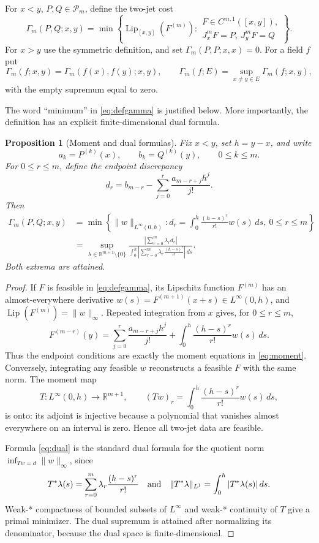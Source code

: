 \documentclass[11pt]{article}
\newtheorem{proposition}[theorem]{Proposition}
\newcommand{\R}{\mathbb R}
\newcommand{\Pm}{\mathcal P_m}
\newcommand{\Lip}{\operatorname{Lip}}
\newcommand{\J}{J}
\begin{document}
For $x<y$, $P,Q\in\Pm$, define the two-jet cost
\begin{equation}\label{eq:defgamma}
 \Gamma_m(P,Q;x,y)=
 \min\left\{\Lip_{[x,y]}(F^{(m)}):
 \begin{array}{l}
 F\in C^{m,1}([x,y]),\\[-2pt]
 \J_x^mF=P,\ \J_y^mF=Q
 \end{array}\right\}.
\end{equation}
For $x>y$ use the symmetric definition, and set
$\Gamma_m(P,P;x,x)=0$.  For a field $f$ put
\[
 \Gamma_m(f;x,y)=\Gamma_m(f(x),f(y);x,y),\qquad
 \Gamma_m(f;E)=\sup_{x\ne y\in E}\Gamma_m(f;x,y),
\]
with the empty supremum equal to zero.

The word ``minimum'' in \eqref{eq:defgamma} is justified below.  More
importantly, the definition has an explicit finite-dimensional dual formula.

\begin{proposition}[Moment and dual formulas]\label{prop:dual}
Fix $x<y$, set $h=y-x$, and write
\[
 a_k=P^{(k)}(x),\qquad b_k=Q^{(k)}(y),\qquad 0\leq k\leq m.
\]
For $0\leq r\leq m$, define the endpoint discrepancy
\begin{equation}\label{eq:delta}
 d_r=b_{m-r}-\sum_{j=0}^{r}\frac{a_{m-r+j}h^j}{j!}.
\end{equation}
Then
\begin{align}
 \Gamma_m(P,Q;x,y)
 &=\min\left\{\|w\|_{L^\infty(0,h)}:
 d_r=\int_0^h\frac{(h-s)^r}{r!}w(s)\,ds,
 \ 0\leq r\leq m\right\}\label{eq:moment}\\
 &=\sup_{\lambda\in\R^{m+1}\setminus\{0\}}
 \frac{\left|\sum_{r=0}^m\lambda_r d_r\right|}
 {\displaystyle\int_0^h
 \left|\sum_{r=0}^m\lambda_r\frac{(h-s)^r}{r!}\right|\,ds}.
 \label{eq:dual}
\end{align}
Both extrema are attained.
\end{proposition}

\begin{proof}
If $F$ is feasible in \eqref{eq:defgamma}, its Lipschitz function $F^{(m)}$
has an almost-everywhere derivative
$w(s)=F^{(m+1)}(x+s)\in L^\infty(0,h)$, and
$\Lip(F^{(m)})=\|w\|_\infty$.  Repeated integration from $x$ gives, for
$0\leq r\leq m$,
\[
 F^{(m-r)}(y)=\sum_{j=0}^{r}\frac{a_{m-r+j}h^j}{j!}
 +\int_0^h\frac{(h-s)^r}{r!}w(s)\,ds.
\]
Thus the endpoint conditions are exactly the moment equations in
\eqref{eq:moment}.  Conversely, integrating any feasible $w$ reconstructs a
feasible $F$ with the same norm.  The moment map
\[
 T:L^\infty(0,h)\longrightarrow\R^{m+1},\qquad
 (Tw)_r=\int_0^h\frac{(h-s)^r}{r!}w(s)\,ds,
\]
is onto: its adjoint is injective because a polynomial that vanishes almost
everywhere on an interval is zero.  Hence all two-jet data are feasible.

Formula \eqref{eq:dual} is the standard dual formula for the quotient norm
$\inf_{Tw=d}\|w\|_\infty$, since
\[
 T^*\lambda(s)=\sum_{r=0}^m
 \lambda_r\frac{(h-s)^r}{r!}
 \quad\hbox{and}\quad
 \|T^*\lambda\|_{L^1}
 =\int_0^h|T^*\lambda(s)|\,ds.
\]
Weak-* compactness of bounded subsets of $L^\infty$ and weak-* continuity
of $T$ give a primal minimizer.  The dual supremum is attained after
normalizing its denominator, because the dual space is finite-dimensional.
\end{proof}
\end{document}
